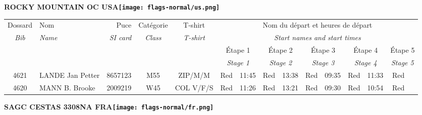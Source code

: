 \documentclass{report}
\begin{document}
\newpage
  \Huge \centering \bfseries ROCKY MOUNTAIN OC  USA\normalfont \footnotesize \sffamily \hfill \texttt{[image: flags-normal/us.png]} \newline 
  \begin{longtable}{|c|l|r|c|c|*{5}{cc|}}
    Dossard & Nom  & Puce    & Catégorie & T-shirt & \multicolumn{10}{c|}{Nom du départ et heures de départ} \\
    \itshape Bib     & \itshape Name & \itshape SI card & \itshape Class  & \itshape  T-shirt  & \multicolumn{10}{c|}{\itshape Start names and start times} \\
    \hline
    & & & & & \multicolumn{2}{c|}{Étape 1} & \multicolumn{2}{c|}{Étape 2} & \multicolumn{2}{c|}{Étape 3} & \multicolumn{2}{c|}{Étape 4} & \multicolumn{2}{c|}{Étape 5} \\
    & & & & & \multicolumn{2}{c|}{\itshape Stage 1} & \multicolumn{2}{c|}{\itshape Stage 2} & \multicolumn{2}{c|}{\itshape Stage 3} & \multicolumn{2}{c|}{\itshape Stage 4} & \multicolumn{2}{c|}{\itshape Stage 5} \\
    \hline
    4621 & LANDE Jan Petter & 8657123 & M55 & ZIP/M/M & Red & 11:45 & Red & 13:38 & Red & 09:35 & Red & 11:33 & Red &  \\
    4620 & MANN B. Brooke & 2009219 & W45 & COL V/F/S & Red & 11:26 & Red & 13:21 & Red & 09:30 & Red & 10:54 & Red &  \\
  \end{longtable}
\newpage
  \Huge \centering \bfseries SAGC CESTAS 3308NA FRA\normalfont \footnotesize \sffamily \hfill \texttt{[image: flags-normal/fr.png]} \newline 
\end{document}

